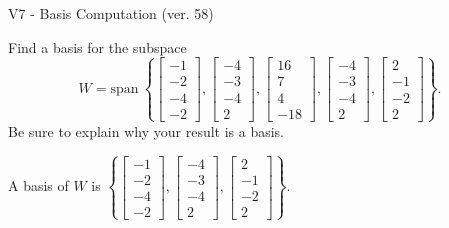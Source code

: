 \begin{exercise}
  \begin{exerciseTitle}V7 - Basis Computation (ver. 58)\end{exerciseTitle}
  \begin{exerciseStatement}
    Find a basis for the subspace 
\[W=\mathrm{span}\ \left\{\left[\begin{array}{r}
-1 \\
-2 \\
-4 \\
-2
\end{array}\right] , \left[\begin{array}{r}
-4 \\
-3 \\
-4 \\
2
\end{array}\right] , \left[\begin{array}{r}
16 \\
7 \\
4 \\
-18
\end{array}\right] , \left[\begin{array}{r}
-4 \\
-3 \\
-4 \\
2
\end{array}\right] , \left[\begin{array}{r}
2 \\
-1 \\
-2 \\
2
\end{array}\right]\right\}.\]
 Be sure to explain why your result is a basis.


  \end{exerciseStatement}
  \begin{exerciseAnswer}
   A basis of \(W\) is  \(\left\{\left[\begin{array}{r}
-1 \\
-2 \\
-4 \\
-2
\end{array}\right] , \left[\begin{array}{r}
-4 \\
-3 \\
-4 \\
2
\end{array}\right] , \left[\begin{array}{r}
2 \\
-1 \\
-2 \\
2
\end{array}\right]\right\}\).
  


  \end{exerciseAnswer}
\end{exercise}